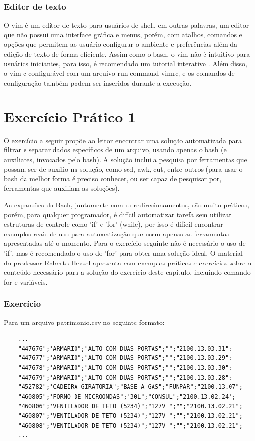 \documentclass[oneside, 11 pt]{article}
\begin{document}
	\section{Editor de texto}
	O vim é um editor de texto para usuários de shell, em outras palavras, um editor que não possui uma interface gráfica e menus, porém, com atalhos, comandos e opções que permitem ao usuário configurar o ambiente e preferências além da edição de texto de forma eficiente. Assim como o bash, o vim não é intuitivo para usuários iniciantes, para isso, é recomendado um tutorial interativo \cite{vimt}. Além disso, o vim é configurável com um arquivo run command vimrc, e os comandos de configuração também podem ser inseridos durante a execução.
	
	\newpage
	\part{Exercício Prático 1}
	
	O exercício a seguir propõe ao leitor encontrar uma solução automatizada para filtrar e separar dados específicos de um arquivo, usando apenas o bash (e auxiliares, invocados pelo bash). A solução inclui a pesquisa por ferramentas que possam ser de auxílio na solução, como sed, awk, cut, entre outros (para usar o bash da melhor forma é preciso conhecer, ou ser capaz de pesquisar por, ferramentas que auxiliam as soluções).

	As expansões do Bash, juntamente com os redirecionamentos, são muito práticos, porém, para qualquer programador, é difícil automatizar tarefa sem utilizar estruturas de controle como 'if' e 'for' (while), por isso é difícil encontrar exemplos reais de uso para automatização que usem apenas as ferramentas apresentadas até o momento. Para o exercício seguinte não é necessário o uso de 'if', mas é recomendado o uso do 'for' para obter uma solução ideal. O material do prodessor Roberto Hexsel \cite{roberto3} apresenta com exemplos práticos e exercícios sobre o conteúdo necessário para a solução do exercício deste capítulo, incluíndo comando for e variáveis.
	
	\section{Exercício}
	Para um arquivo patrimonio.csv no seguinte formato:
	\begin{lstlisting}
	...
	"447676";"ARMARIO";"ALTO COM DUAS PORTAS";"";"2100.13.03.31";
	"447677";"ARMARIO";"ALTO COM DUAS PORTAS";"";"2100.13.03.29";
	"447678";"ARMARIO";"ALTO COM DUAS PORTAS";"";"2100.13.03.30";
	"447679";"ARMARIO";"ALTO COM DUAS PORTAS";"";"2100.13.03.28";
	"452782";"CADEIRA GIRATORIA";"BASE A GAS";"FUNPAR";"2100.13.07";
	"460805";"FORNO DE MICROONDAS";"30L";"CONSUL";"2100.13.02.24";
	"460806";"VENTILADOR DE TETO (5234)";"127V ";"";"2100.13.02.21";
	"460807";"VENTILADOR DE TETO (5234)";"127V ";"";"2100.13.02.21";
	"460808";"VENTILADOR DE TETO (5234)";"127V ";"";"2100.13.02.21";
	...
	\end{lstlisting}
	
\end{document}
